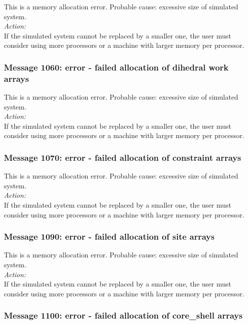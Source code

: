 This is a memory allocation error. Probable cause: excessive size of
simulated system. \\

\noindent
{\em Action:}\\
If the simulated system cannot be replaced by a smaller one, the user
must consider using more processors or a machine with larger memory
per processor.

\subsubsection*{Message 1060: error - failed allocation of dihedral
work arrays}

This is a memory allocation error. Probable cause: excessive size of
simulated system. \\

\noindent
{\em Action:}\\
If the simulated system cannot be replaced by a smaller one, the user
must consider using more processors or a machine with larger memory
per processor.

\subsubsection*{Message 1070: error - failed allocation of constraint
arrays}

This is a memory allocation error. Probable cause: excessive size of
simulated system. \\

\noindent
{\em Action:}\\
If the simulated system cannot be replaced by a smaller one, the user
must consider using more processors or a machine with larger memory
per processor.

\subsubsection*{Message 1090: error - failed allocation of site arrays}

This is a memory allocation error. Probable cause: excessive size of
simulated system. \\

\noindent
{\em Action:}\\
If the simulated system cannot be replaced by a smaller one, the user
must consider using more processors or a machine with larger memory
per processor.

\subsubsection*{Message 1100: error - failed allocation of core\_shell
arrays}

